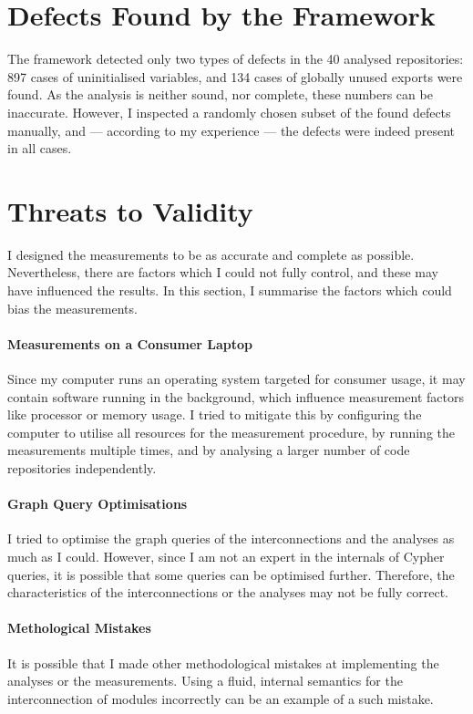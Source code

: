 \section{Defects Found by the Framework}

The framework detected only two types of defects in the 40 analysed repositories: 897 cases of uninitialised variables, and 134 cases of globally unused exports were found. As the analysis is neither sound, nor complete, these numbers can be inaccurate. However, I inspected a randomly chosen subset of the found defects manually, and — according to my experience — the defects were indeed present in all cases.


\section{Threats to Validity}

I designed the measurements to be as accurate and complete as possible. Nevertheless, there are factors which I could not fully control, and these may have influenced the results. In this section, I summarise the factors which could bias the measurements.


\paragraph{Measurements on a Consumer Laptop}
Since my computer runs an operating system targeted for consumer usage, it may contain software running in the background, which influence measurement factors like processor or memory usage. I tried to mitigate this by configuring the computer to utilise all resources for the measurement procedure, by running the measurements multiple times, and by analysing a larger number of code repositories independently.


\paragraph{Graph Query Optimisations}
I tried to optimise the graph queries of the interconnections and the analyses as much as I could. However, since I am not an expert in the internals of Cypher queries, it is possible that some queries can be optimised further. Therefore, the characteristics of the interconnections or the analyses may not be fully correct.


\paragraph{Methological Mistakes}
It is possible that I made other methodological mistakes at implementing the analyses or the measurements. Using a fluid, internal semantics for the interconnection of modules incorrectly can be an example of a such mistake.
